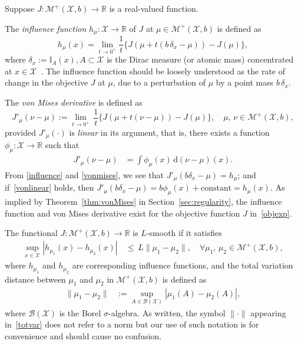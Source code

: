 \documentclass[stsy,sglanonrev]{informs4}
\begin{document}
\begin{definition}\label{def:vonmises} Suppose $J: \mathcal{M}^+(\mathcal{X},b) \to \mathbb{R}$ is a real-valued function.

The \emph{influence function} $h_{\mu}: \mathcal{X} \to \mathbb{R}$ of $J$ at $\mu \in \mathcal{M}^+(\mathcal{X},b)$ is defined as \begin{equation}\label{influence} h_{\mu}(x) = \lim_{t \to 0^+}\frac{1}{t} \bigg\{ J(\mu + t(b\,\delta_x - \mu)) - J(\mu) \bigg\}, \end{equation} where $\delta_x := \mathbb{I}_{A}(x), A \subset \mathcal{X}$ is the Dirac measure (or atomic mass) concentrated at $x \in \mathcal{X}$~\cite{1983fer,2011fer}. The influence function should be loosely understood as the rate of change in the objective $J$ at $\mu$, due to a perturbation of $\mu$ by a point mass $b\,\delta_x$.

The \emph{von Mises derivative} is defined as
\begin{equation}\label{vonmises}
    J'_{\mu}(\nu-\mu) := \lim_{t \to 0^+}\, \frac{1}{t} \bigg\{J(\mu + t(\nu - \mu)) - J(\mu)\bigg\}, \quad \mu,\,\nu\in \mathcal{M}^+(\mathcal{X},b),
\end{equation}
provided $J'_{\mu}(\cdot)$ is \emph{linear} in its argument, that is, there exists a function $\phi_{\mu}: \mathcal{X} \to \mathbb{R}$ such that
\begin{align} \label{vonlinear}
J'_{\mu}(\nu-\mu) &= \int \phi_{\mu}(x)\, \mathrm{d}(\nu - \mu)(x).
\end{align}
From \eqref{influence} and \eqref{vonmises}, we see that $J'_{\mu}(b\delta_x - \mu) = h_\mu$; and if~\eqref{vonlinear} holds, then $J'_{\mu}(b\delta_x - \mu) = b\phi_{\mu}(x) + \mbox{constant} = h_{\mu}(x)$. As implied by Theorem~\ref{thm:vonMises} in Section~\ref{sec:regularity}, the influence function and von Mises derivative exist for the objective function $J$ in~\eqref{objexp}.  \end{definition}

\begin{definition}[{\em L}-Smooth] The functional $J: \mathcal{M}^+(\mathcal{X},b) \to \mathbb{R}$ is $L$-smooth if it satisfies \begin{align}\label{def:Lsmooth}
    \sup_{x \in \mathcal{X}} |h_{\mu_1}(x)-h_{\mu_2}(x) | \, & \leq \, L \|\mu_1 - \mu_2 \|, \quad \forall \mu_1 ,\, \mu_2 \in \mathcal{M}^+(\mathcal{X},b),
\end{align} where $h_{\mu_1}$ and $h_{\mu_2}$ are corresponding influence functions, and the total variation distance between $\mu_1$ and $\mu_2$ in $\mathcal{M}^+(\mathcal{X},b)$ is defined as
\begin{align}\label{totvar}
    \|\mu_1 - \mu_2 \| &:=\sup_{A\in \mathcal{B}(\mathcal{X})} |\mu_1(A)-\mu_2(A) |,
\end{align} where $\mathcal{B}(\mathcal{X})$ is the Borel $\sigma$-algebra.  As written, the symbol $\| \cdot \|$ appearing in~\eqref{totvar} does not refer to a norm but our use of such notation is for convenience and should cause no confusion.
\end{definition} 
\end{document}
